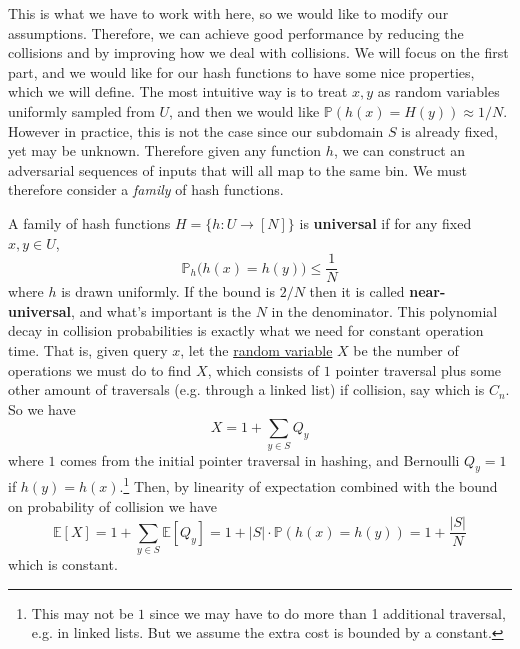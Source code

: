   This is what we have to work with here, so we would like to modify our assumptions. Therefore, we can achieve good performance by reducing the collisions and by improving how we deal with collisions. We will focus on the first part, and we would like for our hash functions to have some nice properties, which we will define. The most intuitive way is to treat $x, y$ as random variables uniformly sampled from $U$, and then we would like $\mathbb{P}(h(x) = H(y)) \approx 1/N$. However in practice, this is not the case since our subdomain $S$ is already fixed, yet may be unknown. Therefore given any function $h$, we can construct an adversarial sequences of inputs that will all map to the same bin. We must therefore consider a \textit{family} of hash functions. 

  \begin{definition}
    \label{def:universal-hashing}
    A family of hash functions $H = \{h : U \rightarrow [N] \}$ is \textbf{universal} if for any fixed $x, y \in U$, 
    \begin{equation}
      \mathbb{P}_{h} \big( h(x) = h(y) \big) \leq \frac{1}{N}
    \end{equation}
    where $h$ is drawn uniformly. If the bound is $2/N$ then it is called \textbf{near-universal}, and what's important is the $N$ in the denominator. This polynomial decay in collision probabilities is exactly what we need for constant operation time. That is, given query $x$, let the \hyperref[prob-def:random-variable]{random variable} $X$ be the number of operations we must do to find $X$, which consists of $1$ pointer traversal plus some other amount of traversals (e.g. through a linked list) if collision, say which is $C_n$. So we have 
    \begin{equation}
      X = 1 + \sum_{y \in S} Q_y
    \end{equation}
    where $1$ comes from the initial pointer traversal in hashing, and Bernoulli $Q_y = 1$ if $h(y) = h(x)$.\footnote{This may not be $1$ since we may have to do more than 1 additional traversal, e.g. in linked lists. But we assume the extra cost is bounded by a constant.} Then, by linearity of expectation combined with the bound on probability of collision we have 
    \begin{equation}
      \mathbb{E}[X] = 1 + \sum_{y \in S} \mathbb{E}[Q_y] = 1 + |S| \cdot \mathbb{P}(h(x) = h(y)) = 1 + \frac{|S|}{N}
    \end{equation} 
    which is constant. 
  \end{definition} 

